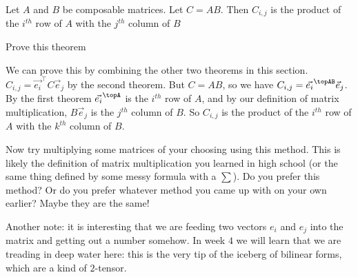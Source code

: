 \documentclass{ximera}
\begin{document}
\begin{theorem}
	Let $A$ and $B$ be composable matrices.  Let $C=AB$.  Then $C_{i,j}$ is the product of the $i^{th}$ row of $A$ with the $j^{th}$ column of $B$
\end{theorem}

Prove this theorem
\begin{free-response}
	We can prove this by combining the other two theorems in this section.  $C_{i,j} = \vec{e_i}^\top C \vec{e}_j$ by the second theorem.  But $C = AB$, so we have 
	$C_{i,j} = \vec{e_i}^\topAB\vec{e}_j$.  By the first theorem $\vec{e_i}^\topA$ is the $i^{th}$ row of $A$, and by our definition of matrix multiplication, 
	$B\vec{e}_j$ is the $j^{th}$ column of $B$. So $C_{i,j}$ is the product of the $i^{th}$ row of $A$ with the $k^{th}$ column of $B$.
\end{free-response}

Now try multiplying some matrices of your choosing using this method.  This is likely the definition of matrix multiplication you learned in high school (or the same thing
defined by some messy formula with a $\sum$).  Do you prefer this method?  Or do you prefer whatever method you came up with on your own earlier?  
Maybe they are the same!

Another note:  it is interesting that we are feeding two vectors $e_i$ and $e_j$ into the matrix and getting out a number somehow.  
In week $4$ we will learn that we are treading in deep water here:  this is the very tip of the iceberg of bilinear forms, which are a kind of $2$-tensor.
  
	
\end{document}
